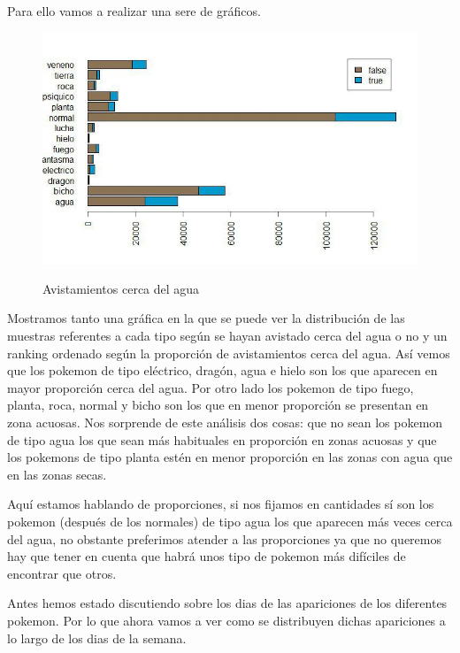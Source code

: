 Para ello vamos a realizar una sere de gráficos.

\begin{figure}[H] %
\centering
\includegraphics[scale=0.8]{img/cercaagua.jpg}  %
\label{img/cercaagua.jpg}
\caption{Avistamientos cerca del agua}
\end{figure}

Mostramos tanto una gráfica en la que se puede ver la distribución de las muestras referentes a cada tipo según se hayan avistado cerca del agua o no y un ranking ordenado según la proporción de avistamientos cerca del agua. Así vemos que los pokemon de tipo eléctrico, dragón, agua e hielo son los que aparecen en mayor proporción cerca del agua. Por otro lado los pokemon de tipo fuego, planta, roca, normal y bicho son los que en menor proporción se presentan en zona acuosas. Nos sorprende de este análisis dos cosas: que no sean los pokemon de tipo agua los que sean más habituales en proporción en zonas acuosas y que los pokemons de tipo planta estén en menor proporción en las zonas con agua que en las zonas secas.

Aquí estamos hablando de proporciones, si nos fijamos en cantidades sí son los pokemon (después de los normales) de tipo agua los que aparecen más veces cerca del agua, no obstante preferimos atender a las proporciones ya que no queremos hay que tener en cuenta que habrá unos tipo de pokemon más difíciles de encontrar que otros.

Antes hemos estado discutiendo sobre los dias de las apariciones de los diferentes pokemon. Por lo que ahora vamos a ver como se distribuyen dichas apariciones a lo largo de los dias de la semana.

